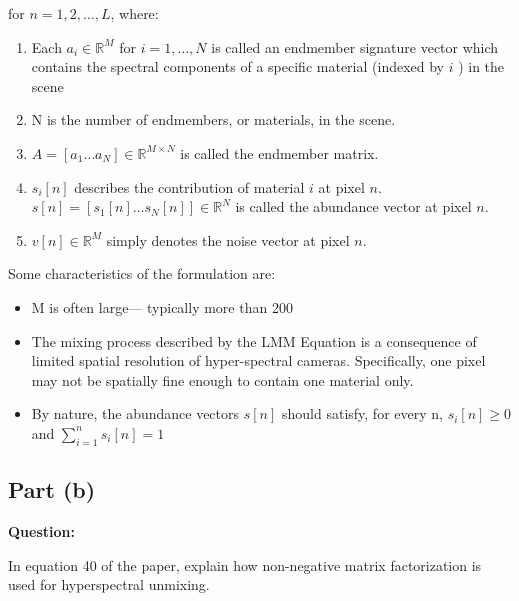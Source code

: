 \documentclass[fleqn, 11pt]{article}
\newcommand{\R}[0]{\mathbb{R}}
\begin{document}
for $n= 1,2,\ldots, L$,  where:  
\begin{enumerate}
    \item Each $ a_i \in \R^M$ for $i = 1, \ldots, N$ is called an
endmember signature vector which contains the spectral components of a specific material 
(indexed by $i$ ) in the scene

    \item N is the number of endmembers, or materials, in the scene. 

    \item $A = [a_1 \ldots a_N] \in \R^{M \times N}$ is called the endmember matrix. 
    
    \item $s_i[n]$ describes the contribution of material $i$ at pixel $n$.  \\
$s[n] = [ s_1[n] \ldots s_N[n] ] \in \R^N$ is called the abundance vector at
pixel $n$. 

    \item $v[n] \in \R^M $ simply denotes the noise vector at pixel $n$.

\end{enumerate}


Some characteristics of the formulation are:

\begin{itemize}
    \item M is often large— typically more than 200
    \item The mixing process described by the LMM Equation is a consequence of limited spatial resolution of          hyper-spectral cameras. Specifically, one pixel may not be spatially fine enough to contain one material      only.
    \item By nature, the abundance vectors $s[n]$ should satisfy, for every n,  $s_i[n] \geq 0$ and $\sum_{i=1}^n s_i[n]=1$
\end{itemize}

\bigskip

\subsection*{Part (b)}

\textbf{Question: }

\smallskip

In equation 40 of the paper, explain how non-negative matrix factorization is used for hyperspectral
unmixing.

\hrulefill

\medskip
\end{document}
